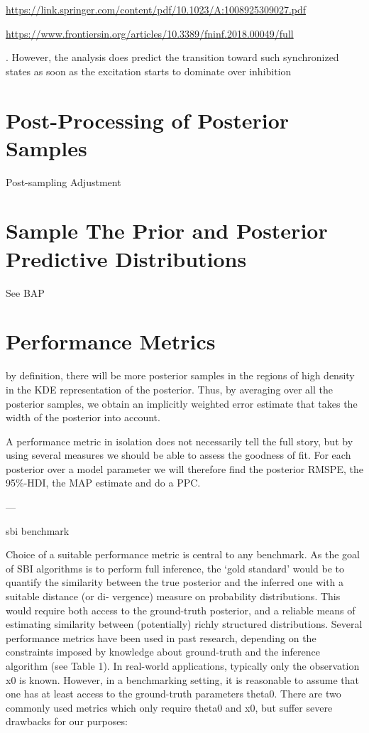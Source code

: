 \url{https://link.springer.com/content/pdf/10.1023/A:1008925309027.pdf}

\url{https://www.frontiersin.org/articles/10.3389/fninf.2018.00049/full}

. However, the analysis does predict the transition
toward such synchronized states as soon as the excitation starts to dominate over inhibition

\section{Post-Processing of Posterior Samples}\label{sec:post_processing}

Post-sampling Adjustment

\section{Sample The Prior and Posterior Predictive Distributions}

See BAP 

\section{Performance Metrics}

by definition, there will be more posterior samples in the regions of high density in the KDE representation of the posterior. Thus, by averaging over all the posterior samples, we obtain an implicitly weighted error estimate that takes the width of the posterior into account. 

A performance metric in isolation does not necessarily tell the full story, but by using several measures we should be able to assess the goodness of fit. For each posterior over a model parameter we will therefore find the posterior RMSPE, the 95\%-HDI, the MAP estimate and do a PPC.

---

sbi benchmark 


Choice of a suitable performance metric is central to any benchmark. As the goal of SBI algorithms is to perform full inference, the ‘gold standard’ would be to quantify the similarity between the true posterior and the inferred one with a suitable distance (or di- vergence) measure on probability distributions. This would require both access to the ground-truth posterior, and a reliable means of estimating similarity between (potentially) richly structured distributions. Several performance metrics have been used in past research, depending on the constraints imposed by knowledge about ground-truth and the inference algorithm (see Table 1). In real-world applications, typically only the observation x0 is known. However, in a benchmarking setting, it is reasonable to assume that one has at least access to the ground-truth parameters theta0. There are two commonly used metrics which only require theta0 and
x0, but suffer severe drawbacks for our purposes:



